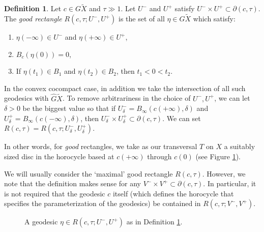 \documentclass[JEP,XML,SOM,Unicode,NoFloatCountersInSection]{cedram}
\theoremstyle{definition}
\newtheorem{defn}[thm]{Definition}
\numberwithin{equation}{section}
\begin{document}
\begin{defn}\label{def:good rectangle}
Let $c\in G\tilde X$ and $\tau \gg 1$. Let $U^-$ and $U^+$ satisfy $U^- \times U^+ \subset \partial (c, \tau)$. The \emph{good rectangle} $R(c, \tau; U^-, U^+)$ is the set of all $\eta \in G \tilde X$ which satisfy:
\begin{enumerate}
\item $\eta(-\infty) \in U^-$ and $\eta(+\infty) \in U^+$,
\item $B_{c}(\eta(0)) = 0$,
\item If $\eta(t_1)\in B_1$ and $\eta(t_2)\in B_2$, then $t_1<0<t_2$.
\end{enumerate}
In the convex cocompact case, in addition we take the intersection of all such geodesics with $\hat G\tilde X$. To remove arbitrariness in the choice of $U^-, U^+$, we can let $\delta>0$ be the biggest value so that if $U^-_\delta = B_\infty(c(+\infty), \delta)$ and $U^+_\delta = B_\infty(c(-\infty), \delta)$, then $U^-_\delta \times U^+_\delta \subset \partial(c, \tau)$. We can set $R(c, \tau)= R(c, \tau; U^-_\delta, U^+_\delta)$.
\end{defn}

In other words, for \emph{good} rectangles, we take as our transversal $T$ on $X$ a suitably sized disc in the horocycle based at $c(+\infty)$ through $c(0)$ (see Figure \ref{fig:good rectangle}).

We will usually consider the `maximal' good rectangle $R(c, \tau)$. However, we note that the definition makes sense for any $V^- \times V^+ \subset \partial (c, \tau)$. In particular, it is not required that the geodesic $c$ itself (which defines the horocycle that specifies the parameterization of the geodesics) be contained in $R(c, \tau; V^-, V^+)$.

\begin{figure}[htb]
\caption{A geodesic $\eta\in R(c, \tau ; U^-,U^+)$ as in Definition \ref{def:good rectangle}.}\label{fig:good rectangle}
\end{figure}
\end{document}
